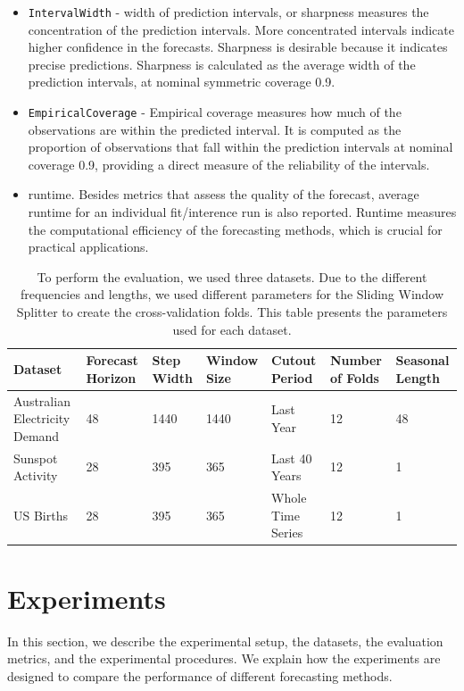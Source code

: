 \begin{itemize}
    \item \texttt{IntervalWidth} - width of prediction intervals, or sharpness measures the concentration of the prediction intervals. More concentrated intervals indicate higher confidence in the forecasts. Sharpness is desirable because it indicates precise predictions. Sharpness is calculated as the average width of the prediction intervals, at nominal symmetric coverage 0.9.
    \item \texttt{EmpiricalCoverage} - Empirical coverage measures how much of the observations are within the predicted interval. It is computed as the proportion of observations that fall within the prediction intervals at nominal coverage 0.9, providing a direct measure of the reliability of the intervals.
    \item runtime. Besides metrics that assess the quality of the forecast, average runtime for an individual fit/interence run is also reported. Runtime measures the computational efficiency of the forecasting methods, which is crucial for practical applications.
 
\end{itemize}

\begin{table}[h]
    \centering
    \footnotesize
    \caption{To perform the evaluation, we used three datasets. Due to the different frequencies and lengths, we used different parameters for the Sliding Window Splitter to create the cross-validation folds. This table presents the parameters used for each dataset.}
    \label{tab:evaluation_splits}
    \begin{tabularx}{\textwidth}{X|X|X|X|X|X|X}
         \toprule
        Dataset & Forecast Horizon & Step Width & Window Size & Cutout Period & Number of Folds & Seasonal Length \\ \midrule
        Australian Electricity Demand & 48 & 1440 & 1440 & Last Year & 12 & 48 \\ 
        Sunspot Activity & 28 & 395 & 365 & Last 40 Years & 12 & 1\\
        US Births & 28 & 395 & 365 & Whole Time Series & 12 & 1 \\
        \bottomrule
    \end{tabularx}
\end{table}


\section{Experiments} \label{experiments}
In this section, we describe the experimental setup, the datasets, the evaluation metrics, and the experimental procedures. We explain how the experiments are designed to compare the performance of different forecasting methods.

